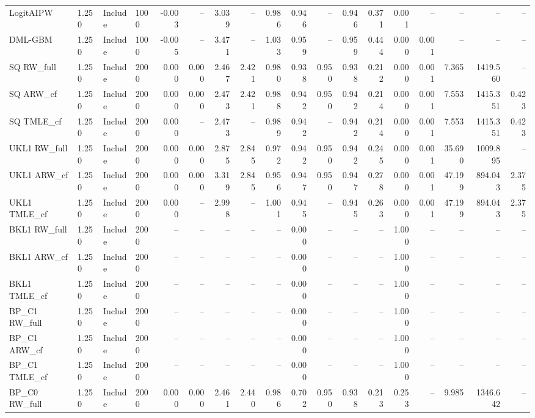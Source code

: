 \begin{tabular}{llllrrrrrrrrrrrrrr}
LogitAIPW & 1.250 & Include & 1000 & -0.003 & -- & 3.039 & -- & 0.986 & 0.946 & -- & 0.946 & 0.371 & 0.001 & -- & -- & -- & -- \\
DML-GBM & 1.250 & Include & 1000 & -0.005 & -- & 3.471 & -- & 1.033 & 0.959 & -- & 0.959 & 0.444 & 0.000 & 0.001 & -- & -- & -- \\
SQ RW\_full & 1.250 & Include & 2000 & 0.000 & 0.000 & 2.467 & 2.421 & 0.980 & 0.938 & 0.950 & 0.938 & 0.212 & 0.000 & 0.001 & 7.365 & 1419.560 & -- \\
SQ ARW\_cf & 1.250 & Include & 2000 & 0.000 & 0.000 & 2.473 & 2.421 & 0.988 & 0.942 & 0.950 & 0.942 & 0.214 & 0.000 & 0.001 & 7.553 & 1415.351 & 0.423 \\
SQ TMLE\_cf & 1.250 & Include & 2000 & 0.000 & -- & 2.473 & -- & 0.989 & 0.942 & -- & 0.942 & 0.214 & 0.000 & 0.001 & 7.553 & 1415.351 & 0.423 \\
UKL1 RW\_full & 1.250 & Include & 2000 & 0.000 & 0.000 & 2.875 & 2.845 & 0.972 & 0.942 & 0.950 & 0.942 & 0.245 & 0.000 & 0.001 & 35.690 & 1009.895 & -- \\
UKL1 ARW\_cf & 1.250 & Include & 2000 & 0.000 & 0.000 & 3.319 & 2.845 & 0.956 & 0.947 & 0.950 & 0.947 & 0.278 & 0.000 & 0.001 & 47.199 & 894.043 & 2.375 \\
UKL1 TMLE\_cf & 1.250 & Include & 2000 & 0.000 & -- & 2.998 & -- & 1.001 & 0.945 & -- & 0.945 & 0.263 & 0.000 & 0.001 & 47.199 & 894.043 & 2.375 \\
BKL1 RW\_full & 1.250 & Include & 2000 & -- & -- & -- & -- & -- & 0.000 & -- & -- & -- & 1.000 & -- & -- & -- & -- \\
BKL1 ARW\_cf & 1.250 & Include & 2000 & -- & -- & -- & -- & -- & 0.000 & -- & -- & -- & 1.000 & -- & -- & -- & -- \\
BKL1 TMLE\_cf & 1.250 & Include & 2000 & -- & -- & -- & -- & -- & 0.000 & -- & -- & -- & 1.000 & -- & -- & -- & -- \\
BP\_C1 RW\_full & 1.250 & Include & 2000 & -- & -- & -- & -- & -- & 0.000 & -- & -- & -- & 1.000 & -- & -- & -- & -- \\
BP\_C1 ARW\_cf & 1.250 & Include & 2000 & -- & -- & -- & -- & -- & 0.000 & -- & -- & -- & 1.000 & -- & -- & -- & -- \\
BP\_C1 TMLE\_cf & 1.250 & Include & 2000 & -- & -- & -- & -- & -- & 0.000 & -- & -- & -- & 1.000 & -- & -- & -- & -- \\
BP\_C0 RW\_full & 1.250 & Include & 2000 & 0.000 & 0.000 & 2.461 & 2.440 & 0.986 & 0.702 & 0.950 & 0.938 & 0.213 & 0.253 & -- & 9.985 & 1346.642 & -- \\

\end{tabular}
